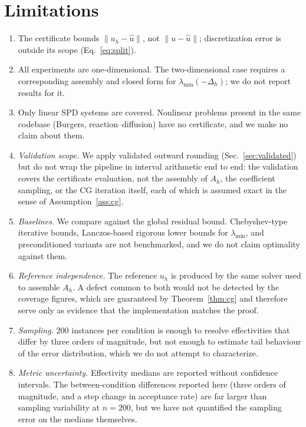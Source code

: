 \documentclass[journal]{IEEEtran}
\theoremstyle{plain}
\theoremstyle{definition}
\begin{document}
\section{Limitations}
\begin{enumerate}
\item The certificate bounds $\|u_h-\hat u\|$, not $\|u-\hat u\|$; discretization error
is outside its scope (Eq.~\eqref{eq:split}).
\item All experiments are one-dimensional. The two-dimensional case requires a
corresponding assembly and closed form for $\lambda_{\min}(-\Delta_h)$; we do not
report results for it.
\item Only linear SPD systems are covered. Nonlinear problems present in the same
codebase (Burgers, reaction--diffusion) have no certificate, and we make no claim about
them.
\item \emph{Validation scope.} We apply validated outward rounding
(Sec.~\ref{sec:validated}) but do not wrap the pipeline in interval arithmetic
end to end: the validation covers the certificate evaluation, not the assembly
of $A_h$, the coefficient sampling, or the CG iteration itself, each of which is
assumed exact in the sense of Assumption~\ref{ass:cg}.
\item \emph{Baselines.} We compare against the global residual bound. Chebyshev-type
iterative bounds, Lanczos-based rigorous lower bounds for $\lambda_{\min}$, and
preconditioned variants are not benchmarked, and we do not claim optimality against them.
\item \emph{Reference independence.} The reference $u_h$ is produced by the same solver
used to assemble $A_h$. A defect common to both would not be detected by the coverage
figures, which are guaranteed by Theorem~\ref{thm:cg} and therefore serve only as
evidence that the implementation matches the proof.
\item \emph{Sampling.} $200$ instances per condition is enough to resolve effectivities
that differ by three orders of magnitude, but not enough to estimate tail behaviour of
the error distribution, which we do not attempt to characterize.
\item \emph{Metric uncertainty.} Effectivity medians are reported without confidence
intervals. The between-condition differences reported here (three orders of magnitude,
and a step change in acceptance rate) are far larger than sampling variability at $n=200$,
but we have not quantified the sampling error on the medians themselves.
\end{enumerate}
\end{document}
